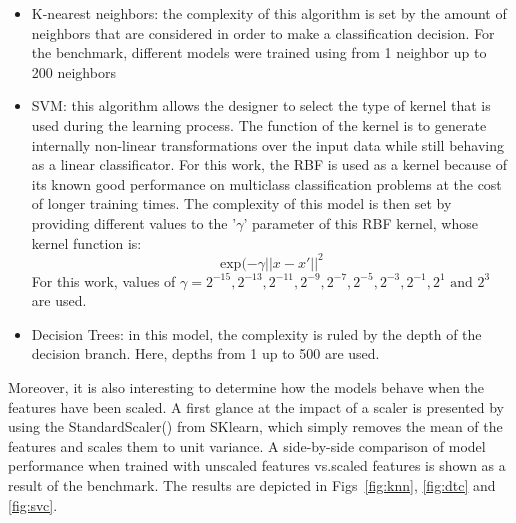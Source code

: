 \begin{itemize}
    \item K-nearest neighbors: the complexity of this algorithm is set by the amount of neighbors that are considered in order to make a classification decision. For the benchmark, different models were trained using from 1 neighbor up to 200 neighbors
    \item \ac{SVM}: this algorithm allows the designer to select the type of kernel that is used during the learning process. The function of the kernel is to generate internally non-linear transformations over the input data while still behaving as a linear classificator. For this work, the \ac{RBF} is used as a kernel because of its known good performance on multiclass classification problems at the cost of longer training times. The complexity of this model is then set by providing different values to the '\(\gamma\)' parameter of this \ac{RBF} kernel, whose kernel function is:
        \begin{equation}
            \text{exp}(-\gamma || x - x'||^2
        \end{equation}
        For this work, values of \(\gamma=2^{-15}, 2^{-13}, 2^{-11}, 2^{-9}, 2^{-7}, 2^{-5}, 2^{-3}, 2^{-1}, 2^{1} \text{ and }2^{3} \) are used.


    \item Decision Trees: in this model, the complexity is ruled by the depth of the decision branch. Here, depths from 1 up to 500 are used.
\end{itemize}

Moreover, it is also interesting to determine how the models behave when the features have been scaled. A first glance at the impact of a scaler is presented by using the StandardScaler() from SKlearn, which simply removes the mean of the features and scales them to unit variance. A side-by-side comparison of model performance when trained with unscaled features vs.scaled features is shown as a result of the benchmark. The results are depicted in Figs~\ref{fig:knn}, \ref{fig:dtc} and \ref{fig:svc}.

